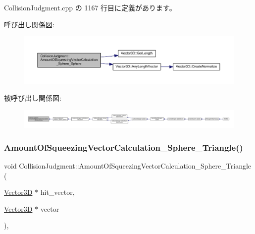  Collision\+Judgment.\+cpp の 1167 行目に定義があります。

呼び出し関係図\+:\nopagebreak
\begin{figure}[H]
\begin{center}
\leavevmode
\includegraphics[width=350pt]{class_collision_judgment_aeb97af19dd3282bb85eb342c315a1ac3_cgraph}
\end{center}
\end{figure}
被呼び出し関係図\+:
\nopagebreak
\begin{figure}[H]
\begin{center}
\leavevmode
\includegraphics[width=350pt]{class_collision_judgment_aeb97af19dd3282bb85eb342c315a1ac3_icgraph}
\end{center}
\end{figure}
\mbox{\label{class_collision_judgment_a9b00e793394f46bdc74e6efa434c0255}} 
\subsubsection{\texorpdfstring{Amount\+Of\+Squeezing\+Vector\+Calculation\+\_\+\+Sphere\+\_\+\+Triangle()}{AmountOfSqueezingVectorCalculation\_Sphere\_Triangle()}}
{\footnotesize\ttfamily void Collision\+Judgment\+::\+Amount\+Of\+Squeezing\+Vector\+Calculation\+\_\+\+Sphere\+\_\+\+Triangle (\begin{DoxyParamCaption}\item[{\mbox{\hyperlink{class_vector3_d}{Vector3D}} $\ast$}]{hit\+\_\+vector,  }\item[{\mbox{\hyperlink{class_vector3_d}{Vector3D}} $\ast$}]{vector }\end{DoxyParamCaption})\hspace{0.3cm}{\ttfamily [static]}, {\ttfamily [private]}}



